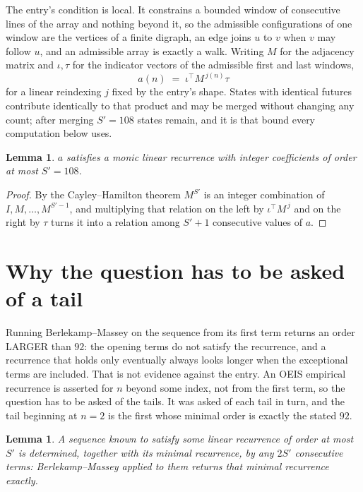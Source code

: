 \documentclass[11pt,a4paper]{article}
\theoremstyle{plain}
\newtheorem{lemma}[theorem]{Lemma}
\theoremstyle{definition}
\begin{document}
The entry's condition is local. It constrains a bounded window of consecutive lines of the
array and nothing beyond it, so the admissible configurations of one window are the vertices of
a finite digraph, an edge joins $u$ to $v$ when $v$ may follow $u$, and an admissible array is
exactly a walk. Writing $M$ for the adjacency matrix and $\iota,\tau$ for the indicator vectors
of the admissible first and last windows,
\[
a(n)\;=\;\iota^{\!\top}M^{\,j(n)}\tau
\]
for a linear reindexing $j$ fixed by the entry's shape. States with identical futures
contribute identically to that product and may be merged without changing any count; after
merging $S'=108$ states remain, and it is that bound every computation below uses.

\begin{lemma}\label{lem:cf}
$a$ satisfies a monic linear recurrence with integer coefficients of order at most $S'=108$.
\end{lemma}

\begin{proof}
By the Cayley--Hamilton theorem $M^{S'}$ is an integer combination of $I,M,\dots,M^{S'-1}$,
and multiplying that relation on the left by $\iota^{\!\top}M^{\,j}$ and on the right by
$\tau$ turns it into a relation among $S'+1$ consecutive values of $a$.
\end{proof}

\section{Why the question has to be asked of a tail}

Running Berlekamp--Massey on the sequence from its first term returns an order LARGER than $92$: the opening terms do not satisfy the recurrence, and a recurrence that holds only eventually always looks longer when the exceptional terms are included. That is not evidence against the entry. An OEIS empirical recurrence is asserted for $n$ beyond some index, not from the first term, so the question has to be asked of the tails. It was asked of each tail in turn, and the tail beginning at $n=2$ is the first whose minimal order is exactly the stated $92$.

\begin{lemma}\label{lem:bm}
A sequence known to satisfy some linear recurrence of order at most $S'$ is determined,
together with its minimal recurrence, by any $2S'$ consecutive terms: Berlekamp--Massey applied
to them returns that minimal recurrence exactly.
\end{lemma}
\end{document}

